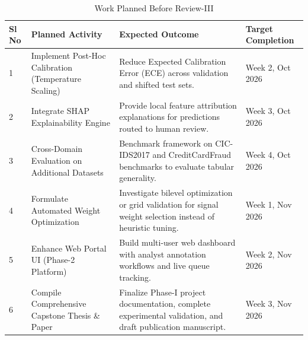 \begin{table}[H]
\centering
\small
\begin{tabular}{p{} p{} p{} p{}}
\toprule
\textbf{Sl No} & \textbf{Planned Activity} & \textbf{Expected Outcome} & \textbf{Target Completion} \\
\midrule
1 & Implement Post-Hoc Calibration (Temperature Scaling) & Reduce Expected Calibration Error (ECE) across validation and shifted test sets. & Week 2, Oct 2026 \\
2 & Integrate SHAP Explainability Engine & Provide local feature attribution explanations for predictions routed to human review. & Week 3, Oct 2026 \\
3 & Cross-Domain Evaluation on Additional Datasets & Benchmark framework on CIC-IDS2017 and CreditCardFraud benchmarks to evaluate tabular generality. & Week 4, Oct 2026 \\
4 & Formulate Automated Weight Optimization & Investigate bilevel optimization or grid validation for signal weight selection instead of heuristic tuning. & Week 1, Nov 2026 \\
5 & Enhance Web Portal UI (Phase-2 Platform) & Build multi-user web dashboard with analyst annotation workflows and live queue tracking. & Week 2, Nov 2026 \\
6 & Compile Comprehensive Capstone Thesis \& Paper & Finalize Phase-I project documentation, complete experimental validation, and draft publication manuscript. & Week 3, Nov 2026 \\
\bottomrule
\end{tabular}
\caption{Work Planned Before Review-III}
\end{table}

